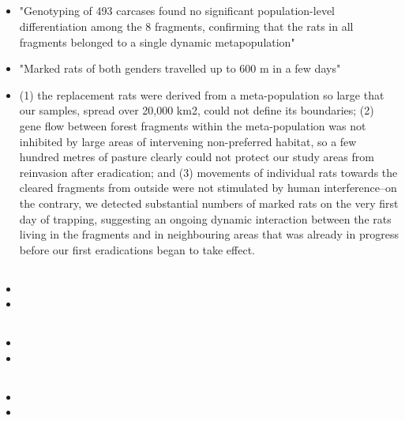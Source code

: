 \documentclass[document.tex]{subfiles}
\begin{document}
    \subsection{}
    \begin{itemize}
    \item "Genotyping of 493 carcases found no significant population-level differentiation among the 8 fragments, confirming that the rats in all fragments belonged to a single dynamic metapopulation"
    \item "Marked rats of both genders travelled up to 600 m in a few days"
    \item (1) the replacement rats were derived from a meta-population so large that our samples, spread over 20,000 km2, could not define its boundaries; (2) gene flow between forest fragments within the meta-population was not inhibited by large areas of intervening non-preferred habitat, so a few hundred metres of pasture clearly could not protect our study areas from reinvasion after eradication; and (3) movements of individual rats towards the cleared fragments from outside were not stimulated by human interference–on the contrary, we detected substantial numbers of marked rats on the very first day of trapping, suggesting an ongoing dynamic interaction between the rats living in the fragments and in neighbouring areas that was already in progress before our first eradications began to take effect.
    \end{itemize}

    \subsection{}
    \begin{itemize}
    \item 
    \item 
    \end{itemize}

    \subsection{\citetitle{}}
    \begin{itemize}
    \item 
    \item 
    \end{itemize}

    \subsection{\citetitle{}}
    \begin{itemize}
    \item 
    \item 
    \end{itemize}
\end{document}
